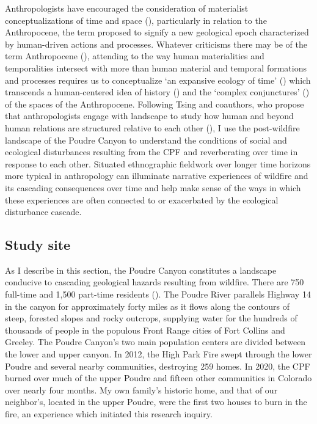 \documentclass[
]{article}
\begin{document}
Anthropologists have encouraged the consideration of materialist conceptualizations of time and space (), particularly in relation to the Anthropocene, the term proposed to signify a new geological epoch characterized by human-driven actions and processes. Whatever criticisms there may be of the term Anthropocene (), attending to the way human materialities and temporalities intersect with more than human material and temporal formations and processes requires us to conceptualize `an expansive ecology of time' () which transcends a human-centered idea of history () and the `complex conjunctures' () of the spaces of the Anthropocene. Following Tsing and coauthors, who propose that anthropologists engage with landscape to study how human and beyond human relations are structured relative to each other (), I use the post-wildfire landscape of the Poudre Canyon to understand the conditions of social and ecological disturbances resulting from the CPF and reverberating over time in response to each other. Situated ethnographic fieldwork over longer time horizons more typical in anthropology can illuminate narrative experiences of wildfire and its cascading consequences over time and help make sense of the ways in which these experiences are often connected to or exacerbated by the ecological disturbance cascade.

\subsection{Study site}\label{study-site}

As I describe in this section, the Poudre Canyon constitutes a landscape conducive to cascading geological hazards resulting from wildfire. There are 750 full-time and 1,500 part-time residents (). The Poudre River parallels Highway 14 in the canyon for approximately forty miles as it flows along the contours of steep, forested slopes and rocky outcrops, supplying water for the hundreds of thousands of people in the populous Front Range cities of Fort Collins and Greeley. The Poudre Canyon's two main population centers are divided between the lower and upper canyon. In 2012, the High Park Fire swept through the lower Poudre and several nearby communities, destroying 259 homes. In 2020, the CPF burned over much of the upper Poudre and fifteen other communities in Colorado over nearly four months. My own family's historic home, and that of our neighbor's, located in the upper Poudre, were the first two houses to burn in the fire, an experience which initiated this research inquiry.
\end{document}
